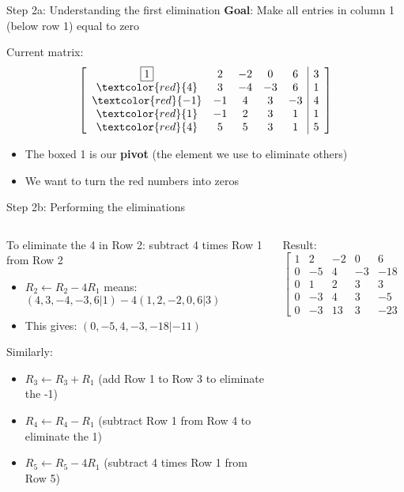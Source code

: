 \documentclass[aspectratio=169, lualatex, handout]{beamer}
\begin{document}
\begin{frame}{Step 2a: Understanding the first elimination}
	\textbf{Goal}: Make all entries in column 1 (below row 1) equal to zero

	Current matrix:
	\[
		\left[\begin{array}{ccccc|c}
				\boxed{1}           & 2  & -2 & 0  & 6  & 3 \\
				\textcolor{red}{4}  & 3  & -4 & -3 & 6  & 1 \\
				\textcolor{red}{-1} & -1 & 4  & 3  & -3 & 4 \\
				\textcolor{red}{1}  & -1 & 2  & 3  & 1  & 1 \\
				\textcolor{red}{4}  & 5  & 5  & 3  & 1  & 5
			\end{array}\right]
	\]

	\begin{itemize}
		\item The boxed 1 is our \textbf{pivot} (the element we use to eliminate others)
		\item We want to turn the red numbers into zeros
	\end{itemize}
\end{frame}

\begin{frame}{Step 2b: Performing the eliminations}
	\begin{columns}[c]
		\begin{column}{0.6\textwidth}
			To eliminate the 4 in Row 2: subtract 4 times Row 1 from Row 2
			\begin{itemize}
				\item $R_2 \leftarrow R_2 - 4R_1$ means: $(4, 3, -4, -3, 6 | 1) - 4(1, 2, -2, 0, 6 | 3)$
				\item This gives: $(0, -5, 4, -3, -18 | -11)$
			\end{itemize}

			Similarly:
			\begin{itemize}
				\item $R_3 \leftarrow R_3 + R_1$ (add Row 1 to Row 3 to eliminate the -1)
				\item $R_4 \leftarrow R_4 - R_1$ (subtract Row 1 from Row 4 to eliminate the 1)
				\item $R_5 \leftarrow R_5 - 4R_1$ (subtract 4 times Row 1 from Row 5)
			\end{itemize}
		\end{column}
		\begin{column}{0.4\textwidth}
			Result:
			\[
				\left[\begin{array}{ccccc|c}
						1 & 2  & -2 & 0  & 6   & 3   \\
						0 & -5 & 4  & -3 & -18 & -11 \\
						0 & 1  & 2  & 3  & 3   & 7   \\
						0 & -3 & 4  & 3  & -5  & -2  \\
						0 & -3 & 13 & 3  & -23 & -7
					\end{array}\right]
			\]
		\end{column}
	\end{columns}
\end{frame}
\end{document}
